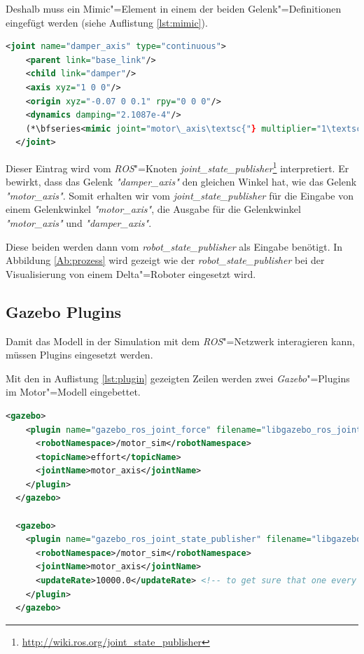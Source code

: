 Deshalb muss ein Mimic"=Element in einem der beiden Gelenk"=Definitionen eingefügt werden (siehe Auflistung \ref{lst:mimic}). 
\begin{lstlisting}[language=xml, captionpos=b, caption=Mimic in URDF-Joint, label={lst:mimic}, gobble=2]
  <joint name="damper_axis" type="continuous">
    <parent link="base_link"/>
    <child link="damper"/>
    <axis xyz="1 0 0"/>
    <origin xyz="-0.07 0 0.1" rpy="0 0 0"/>
    <dynamics damping="2.1087e-4"/>
    (*\bfseries<mimic joint="motor\_axis\textsc{"} multiplier="1\textsc{"} offset="0"/>*)
  </joint>
\end{lstlisting}

Dieser Eintrag wird vom \textit{ROS}"=Knoten \textit{joint\_state\_publisher}\footnote{\url{http://wiki.ros.org/joint_state_publisher}} interpretiert.
Er bewirkt, dass das Gelenk \textit{\textit{"}damper\_axis\textit{"}} den gleichen Winkel hat, wie das Gelenk \textit{\textit{"}motor\_axis\textit{"}}.
Somit erhalten wir vom \textit{joint\_state\_publisher} für die Eingabe von einem Gelenkwinkel \textit{\textit{"}motor\_axis\textit{"}}, die Ausgabe für die Gelenkwinkel \textit{\textit{"}motor\_axis\textit{"}} und \textit{\textit{"}damper\_axis\textit{"}}.

Diese beiden werden dann vom \textit{robot\_state\_publisher} als Eingabe benötigt.
In Abbildung \ref{Ab:prozess} wird gezeigt wie der \textit{robot\_state\_publisher} bei der Visualisierung von einem Delta"=Roboter eingesetzt wird.

\subsection{Gazebo Plugins}
Damit das Modell in der Simulation mit dem \textit{ROS}"=Netzwerk interagieren kann, müssen Plugins eingesetzt werden.

Mit den in Auflistung \ref{lst:plugin} gezeigten Zeilen werden zwei \textit{Gazebo}"=Plugins im Motor"=Modell eingebettet.
\begin{lstlisting}[language=xml, captionpos=b, caption=Plugin in URDF, label={lst:plugin}, gobble=2]
  <gazebo>
    <plugin name="gazebo_ros_joint_force" filename="libgazebo_ros_joint_force.so">
      <robotNamespace>/motor_sim</robotNamespace>
      <topicName>effort</topicName>
      <jointName>motor_axis</jointName>
    </plugin>
  </gazebo>

  <gazebo>
    <plugin name="gazebo_ros_joint_state_publisher" filename="libgazebo_ros_joint_state_publisher.so">
      <robotNamespace>/motor_sim</robotNamespace>
      <jointName>motor_axis</jointName>
      <updateRate>10000.0</updateRate> <!-- to get sure that one every sim step called, up to 10k -->
    </plugin>
  </gazebo>
\end{lstlisting}

